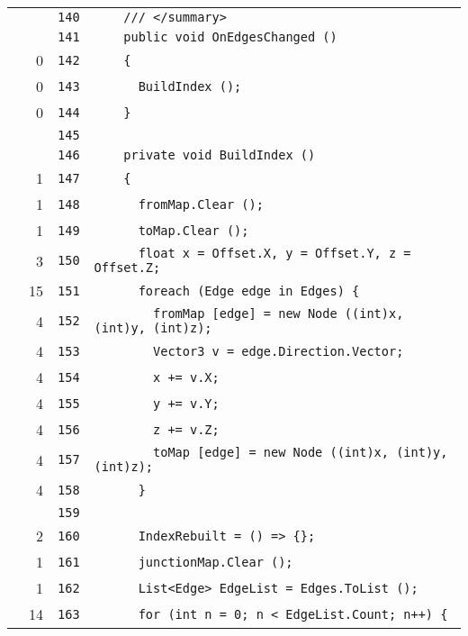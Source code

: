 \documentclass[a4paper,10pt]{article}
\begin{document}
\begin{longtable}[l]{lrrl}
\cellcolor{gray} &  & \verb~140~ & \verb~    /// </summary>~\\
\cellcolor{gray} &  & \verb~141~ & \verb~    public void OnEdgesChanged ()~\\
\cellcolor{red} & 0 & \verb~142~ & \verb~    {~\\
\cellcolor{red} & 0 & \verb~143~ & \verb~      BuildIndex ();~\\
\cellcolor{red} & 0 & \verb~144~ & \verb~    }~\\
\cellcolor{gray} &  & \verb~145~ & \verb~~\\
\cellcolor{gray} &  & \verb~146~ & \verb~    private void BuildIndex ()~\\
\cellcolor{green} & 1 & \verb~147~ & \verb~    {~\\
\cellcolor{green} & 1 & \verb~148~ & \verb~      fromMap.Clear ();~\\
\cellcolor{green} & 1 & \verb~149~ & \verb~      toMap.Clear ();~\\
\cellcolor{green} & 3 & \verb~150~ & \verb~      float x = Offset.X, y = Offset.Y, z = Offset.Z;~\\
\cellcolor{green} & 15 & \verb~151~ & \verb~      foreach (Edge edge in Edges) {~\\
\cellcolor{green} & 4 & \verb~152~ & \verb~        fromMap [edge] = new Node ((int)x, (int)y, (int)z);~\\
\cellcolor{green} & 4 & \verb~153~ & \verb~        Vector3 v = edge.Direction.Vector;~\\
\cellcolor{green} & 4 & \verb~154~ & \verb~        x += v.X;~\\
\cellcolor{green} & 4 & \verb~155~ & \verb~        y += v.Y;~\\
\cellcolor{green} & 4 & \verb~156~ & \verb~        z += v.Z;~\\
\cellcolor{green} & 4 & \verb~157~ & \verb~        toMap [edge] = new Node ((int)x, (int)y, (int)z);~\\
\cellcolor{green} & 4 & \verb~158~ & \verb~      }~\\
\cellcolor{gray} &  & \verb~159~ & \verb~~\\
\cellcolor{green} & 2 & \verb~160~ & \verb~      IndexRebuilt = () => {};~\\
\cellcolor{green} & 1 & \verb~161~ & \verb~      junctionMap.Clear ();~\\
\cellcolor{green} & 1 & \verb~162~ & \verb~      List<Edge> EdgeList = Edges.ToList ();~\\
\cellcolor{green} & 14 & \verb~163~ & \verb~      for (int n = 0; n < EdgeList.Count; n++) {~\\

\end{longtable}
\end{document}
